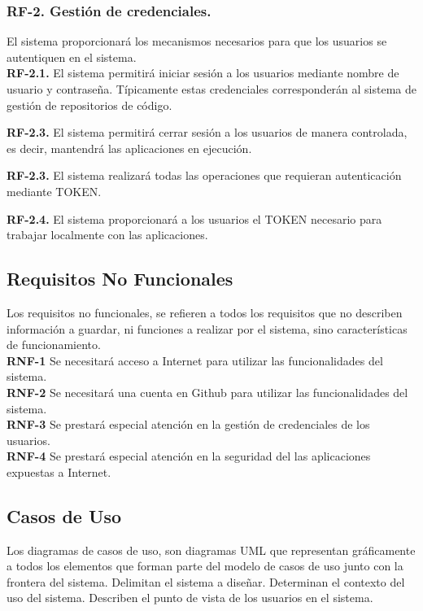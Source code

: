 \documentclass[a4paper,11pt]{book}
\begin{document}
\subsubsection { \textbf{ RF-2. Gestión de credenciales.}} El sistema proporcionará los mecanismos necesarios para que los usuarios se autentiquen en el sistema. \\


\textbf{RF-2.1.} El sistema  permitirá iniciar sesión  a los usuarios mediante nombre de usuario y contraseña. Típicamente estas credenciales corresponderán al sistema de gestión de repositorios de código.

\textbf{RF-2.3.} El sistema  permitirá cerrar sesión a los usuarios de manera controlada, es decir, mantendrá las aplicaciones en ejecución.

\textbf{RF-2.3.} El sistema  realizará todas las operaciones que requieran autenticación mediante TOKEN.

\textbf{RF-2.4.} El sistema  proporcionará a los usuarios el TOKEN necesario para trabajar localmente con las aplicaciones.


\subsection{Requisitos No Funcionales }
Los requisitos no funcionales, se refieren a todos los requisitos que no describen información a guardar, ni funciones a realizar por el sistema, sino características de funcionamiento.\\


\textbf{RNF-1} Se necesitará acceso a Internet para utilizar las funcionalidades del sistema.\\

\textbf{RNF-2} Se necesitará una cuenta en Github para utilizar las funcionalidades del sistema.\\

\textbf{RNF-3} Se prestará especial atención en la gestión de credenciales de los usuarios.\\

\textbf{RNF-4} Se prestará especial atención en la seguridad del  las aplicaciones expuestas a Internet.
\subsection{Casos de Uso}
Los diagramas de casos de uso, son diagramas UML que representan gráficamente a todos los elementos que forman parte del modelo de casos de uso junto con la frontera del sistema. Delimitan el sistema a diseñar. Determinan el contexto del uso del sistema. Describen el punto de vista de los usuarios  en el sistema.
\end{document}
